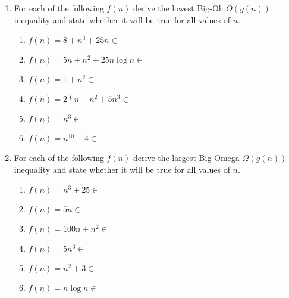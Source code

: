 \documentclass[11pt,final,twoside]{article}  %
\title{}  %
\author{Michael Turnbull\\
    \texttt{michael.turnbull@und.edu}}
\date{\today}
\begin{document}
    \maketitle
    

\begin{enumerate}
    \item For each of the following $f(n)$ derive the lowest Big-Oh $O(g(n))$ inequality and state whether it will be true for all values of $n$.
    \begin{enumerate}
        \item $f(n) = 8 + n^3 + 25n \in$ 
        \item $f(n) = 5n + n^2 + 25n\log{n} \in$ 
        \item $f(n) = 1 + n^2 \in$ 
        \item $f(n) = 2*n + n^2 + 5n^3 \in$ 
        \item $f(n) = n^3 \in$ 
        \item $f(n) = n^{10} - 4 \in$ 
    \end{enumerate}
    \item For each of the following $f(n)$ derive the largest Big-Omega $\Omega(g(n))$ inequality and state whether it will be true for all values of $n$.
    \begin{enumerate}
        \item $f(n) = n^3 + 25 \in$ 
        \item $f(n) = 5n \in$ 
        \item $f(n) = 100n + n^2 \in$ 
        \item $f(n) = 5n^3 \in$ 
        \item $f(n) = n^2 + 3 \in$ 
        \item $f(n) = n\log{n} \in$ 
    \end{enumerate}
\end{enumerate}
\end{document}

